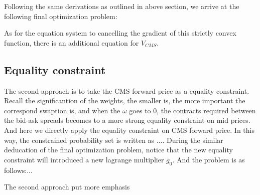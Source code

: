 Following the same derivations as outlined in above section, we arrive at the following final optimization problem:

As for the equation system to cancelling the gradient of this strictly convex function, there is an additional equation for $V_{CMS}$.

\subsection{Equality constraint}
The second approach is to take the CMS forward price as a equality constraint. Recall the significantion of the weights, the smaller is, the 
more important the correspond swaption is, and when the $\omega$ goes to 0, the contracts required between the bid-ask spreads becomes to 
a more strong equality constraint on mid prices. And here we directly apply the equality constraint on CMS forward price. 
In this way, the constrained probability set is written as $...$. During the similar deducation of the final optimization problem, 
notice that the new equality constraint will introduced a new lagrange multiplier $g_0$. And the problem is as follows:...

The second approach put more emphasis 


